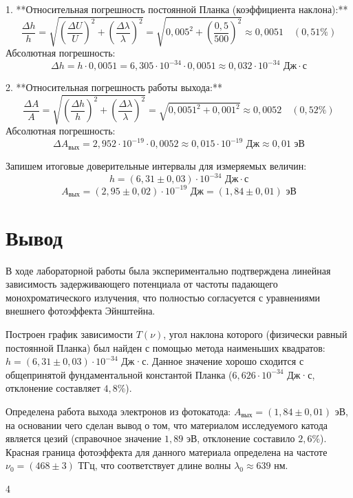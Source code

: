 \documentclass[a4paper,12pt]{article}
\begin{document}
1. **Относительная погрешность постоянной Планка (коэффициента наклона):**
\begin{equation*}
\frac{\Delta h}{h} = \sqrt{\left(\frac{\Delta U}{U}\right)^2 + \left(\frac{\Delta \lambda}{\lambda}\right)^2} = \sqrt{0{,}005^2 + \left(\frac{0{,}5}{500}\right)^2} \approx 0{,}0051 \quad (0{,}51\%)
\end{equation*}
Абсолютная погрешность:
\begin{equation*}
\Delta h = h \cdot 0{,}0051 = 6{,}305 \cdot 10^{-34} \cdot 0{,}0051 \approx 0{,}032 \cdot 10^{-34} \text{ Дж}\cdot\text{с}
\end{equation*}

2. **Относительная погрешность работы выхода:**
\begin{equation*}
\frac{\Delta A}{A} = \sqrt{\left(\frac{\Delta h}{h}\right)^2 + \left(\frac{\Delta \lambda}{\lambda}\right)^2} = \sqrt{0{,}0051^2 + 0{,}001^2} \approx 0{,}0052 \quad (0{,}52\%)
\end{equation*}
Абсолютная погрешность:
\begin{equation*}
\Delta A_{\text{вых}} = 2{,}952 \cdot 10^{-19} \cdot 0{,}0052 \approx 0{,}015 \cdot 10^{-19} \text{ Дж} \approx 0{,}01 \text{ эВ}
\end{equation*}

Запишем итоговые доверительные интервалы для измеряемых величин:
\begin{equation*}
h = (6{,}31 \pm 0{,}03) \cdot 10^{-34} \text{ Дж}\cdot\text{с}
\end{equation*}
\begin{equation*}
A_{\text{вых}} = (2{,}95 \pm 0{,}02) \cdot 10^{-19} \text{ Дж} = (1{,}84 \pm 0{,}01) \text{ эВ}
\end{equation*}

\section{Вывод}

В ходе лабораторной работы была экспериментально подтверждена линейная зависимость задерживающего потенциала от частоты падающего монохроматического излучения, что полностью согласуется с уравнениями внешнего фотоэффекта Эйнштейна.

Построен график зависимости $T(\nu)$, угол наклона которого (физически равный постоянной Планка) был найден с помощью метода наименьших квадратов: $h = (6{,}31 \pm 0{,}03) \cdot 10^{-34}$ Дж·с. Данное значение хорошо сходится с общепринятой фундаментальной константой Планка ($6{,}626 \cdot 10^{-34}$ Дж·с, отклонение составляет $4{,}8\%$).

Определена работа выхода электронов из фотокатода: $A_{\text{вых}} = (1{,}84 \pm 0{,}01)$ эВ, на основании чего сделан вывод о том, что материалом исследуемого катода является цезий (справочное значение $1{,}89$ эВ, отклонение составило $2{,}6\%$). Красная граница фотоэффекта для данного материала определена на частоте $\nu_0 = (468 \pm 3)$ ТГц, что соответствует длине волны $\lambda_0 \approx 639$ нм.

\vfill
\begin{flushright}
    4
\end{flushright}
\end{document}
